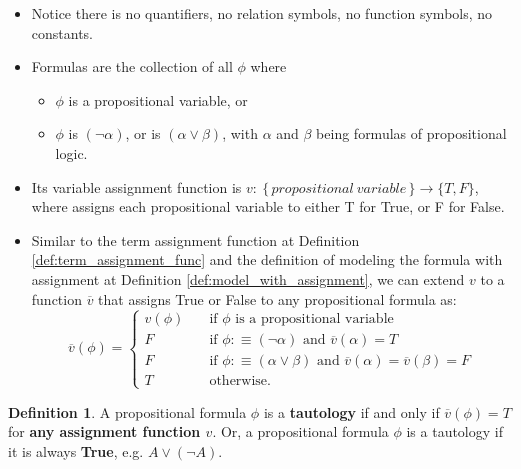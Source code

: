 \documentclass[11pt,letterpaper]{book}
\theoremstyle{definition}
\newtheorem{definition}{Definition}[section]
\begin{document}
\begin{itemize}
\item{Notice there is no quantifiers, no relation symbols, no function
symbols, no constants.}
\item{Formulas are the collection of all $\phi$ where}
\begin{itemize}
\item{$\phi$ is a propositional variable, or}
\item{$\phi$ is $(\lnot \alpha)$, or is $(\alpha \lor \beta)$, with
$\alpha$ and $\beta$ being formulas of propositional logic.}
\end{itemize}

\item{Its variable assignment function is $v: \ \{\,  propositional \
variable \, \} \rightarrow \{T, F \}$, where assigns each propositional
variable to either T for True, or F for False.}

\item{Similar to the term assignment function at Definition
\ref{def:term_assignment_func} and the definition of modeling the
formula with assignment at Definition
\ref{def:model_with_assignment}, we can extend $v$ to a function
$\overline{v}$ that assigns True or False to any propositional formula as:
\begin{equation}\label{eq:proposition_formula_assign_func}
\overline{v} (\phi) = \begin{cases}
v(\phi) & \quad \text{if } \phi \text{ is a propositional variable} \\
F & \quad \text{if } \phi :\equiv (\lnot \alpha ) \text{ and }
\overline{v} (\alpha) = T \\
F & \quad \text{if } \phi :\equiv ( \alpha \lor \beta ) \text{ and }
\overline{v} (\alpha) = \overline{v} (\beta) = F \\
T & \quad \text{otherwise. }
\end{cases}
\end{equation}
}


\end{itemize}

\begin{definition}\label{def:proposition_tautology}
A propositional formula $\phi$ is a \textbf{tautology} if and only if
$\overline{v} (\phi) = T$ for \textbf{any assignment function $v$}. Or, a
propositional formula $\phi$ is a tautology if it is always \textbf{True},
e.g. $A \lor (\lnot A)$.
\end{definition}
\end{document}
